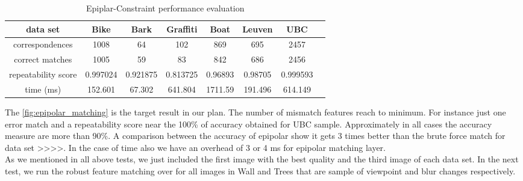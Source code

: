 \begin{table}[H]
  \begin{tabular}{| c || c | c | c | c | c | c | c |}
      \hline
      data set & Bike & Bark & Graffiti & Boat & Leuven & UBC \\ \hline \hline
      correspondences & 1008 & 64 & 102 & 869 & 695 & 2457 \\ \hline
      correct matches & 1005 & 59 & 83 & 842 & 686 & 2456 \\ \hline
      repeatability score & 0.997024 & 0.921875 & 0.813725 & 0.96893 & 0.98705 & 0.999593 \\ \hline
      time (ms) & 152.601 & 67.302 & 641.804 & 1711.59 & 191.496 & 614.149 \\ \hline
  \end{tabular}
  \caption{Epiplar-Constraint performance evaluation} \label{tab:epipolar_matching_eval}
\end{table}

The \autoref{fig:epipolar_matching} is the target result in our plan. The number of mismatch features reach to minimum. For instance just one error match and a repeatability score near the 100\% of accuracy obtained for UBC sample. Approximately in all cases the accuracy measure are more than 90\%. A comparison between the accuracy of epipolar show it gets 3 times better than the brute force match for data set >>>>. In the case of time also we have an overhead of 3 or 4 ms for epipolar matching layer.\\
As we mentioned in all above tests, we just included the first image with the best quality and the third image of each data set. In the next test, we run the robust feature matching over for all images in Wall and Trees that are sample of viewpoint and blur changes respectively. 

